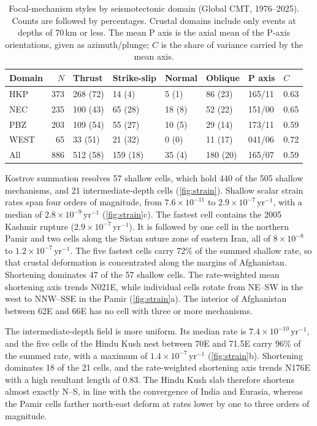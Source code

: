 \documentclass[11pt]{article}
\begin{document}
\begin{table}[htbp]\centering
  \caption{Focal-mechanism styles by seismotectonic domain (Global CMT, 1976--2025).
  Counts are followed by percentages. Crustal domains include only events at depths of
  70\,km or less. The mean P axis is the axial mean of the P-axis orientations, given
  as azimuth/plunge; $C$ is the share of variance carried by the mean axis.}
  \label{tab:meca}
  \begin{tabular}{lrllllll}
    \toprule
    Domain & $N$ & Thrust & Strike-slip & Normal & Oblique & P axis & $C$ \\
    \midrule
    HKP & 373 & 268 (72) & 14 (4) & 5 (1) & 86 (23) & 165/11 & 0.63 \\
    NEC & 235 & 100 (43) & 65 (28) & 18 (8) & 52 (22) & 151/00 & 0.65 \\
    PBZ & 203 & 109 (54) & 55 (27) & 10 (5) & 29 (14) & 173/11 & 0.59 \\
    WEST & 65 & 33 (51) & 21 (32) & 0 (0) & 11 (17) & 041/06 & 0.72 \\
    All & 886 & 512 (58) & 159 (18) & 35 (4) & 180 (20) & 165/07 & 0.59 \\
    \bottomrule
  \end{tabular}
\end{table}

Kostrov summation resolves 57 shallow cells, which hold 440 of the 505 shallow
mechanisms, and 21 intermediate-depth cells (\cref{fig:strain}). Shallow scalar strain
rates span four orders of magnitude, from $7.6\times10^{-11}$ to
$2.9\times10^{-7}$\,yr$^{-1}$, with a median of $2.8\times10^{-9}$\,yr$^{-1}$
(\cref{fig:strain}c). The fastest cell contains the 2005 Kashmir rupture
($2.9\times10^{-7}$\,yr$^{-1}$). It is followed by one cell in the northern Pamir and
two cells along the Sistan suture zone of eastern Iran, all of $8\times10^{-8}$ to
$1.2\times10^{-7}$\,yr$^{-1}$. The five fastest cells carry 72\% of the summed shallow
rate, so that crustal deformation is concentrated along the margins of Afghanistan.
Shortening dominates 47 of the 57 shallow cells. The rate-weighted mean shortening axis
trends N021\textdegree E, while individual cells rotate from NE--SW in the west to
NNW--SSE in the Pamir (\cref{fig:strain}a). The interior of Afghanistan between
62\textdegree E and 66\textdegree E has no cell with three or more mechanisms.

The intermediate-depth field is more uniform. Its median rate is
$7.4\times10^{-10}$\,yr$^{-1}$, and the five cells of the Hindu Kush nest between
70\textdegree E and 71.5\textdegree E carry 96\% of the summed rate, with a maximum of
$1.4\times10^{-7}$\,yr$^{-1}$ (\cref{fig:strain}b). Shortening dominates 18 of the
21 cells, and the rate-weighted shortening axis trends N176\textdegree E with a high
resultant length of 0.83. The Hindu Kush slab therefore shortens almost exactly N--S,
in line with the convergence of India and Eurasia, whereas the Pamir cells farther
north-east deform at rates lower by one to three orders of magnitude.
\end{document}
